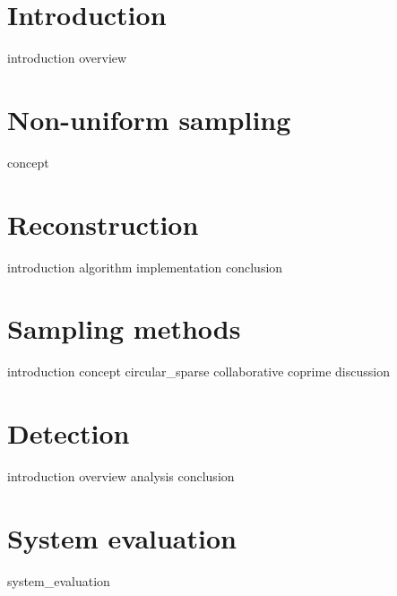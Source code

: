 \documentclass[a4paper, openany, oneside]{memoir}
\begin{document}
\chapter{Introduction}
\label{cha:overview}
{introduction}
{overview}

\chapter{Non-uniform sampling}
\label{cha:sampling}
{concept}

\chapter{Reconstruction}
\label{cha:reconstruction}
{introduction}
{algorithm}
{implementation}
{conclusion}

\chapter{Sampling methods}
\label{cha:sampling_methods}
{introduction}
{concept}
{circular_sparse}
{collaborative}
{coprime}
{discussion}

\chapter{Detection}
\label{cha:detection}
{introduction}
{overview}
{analysis}
{conclusion}

\chapter{System evaluation}
\label{cha:system_evaluation_theory}
{system_evaluation}
\end{document}
